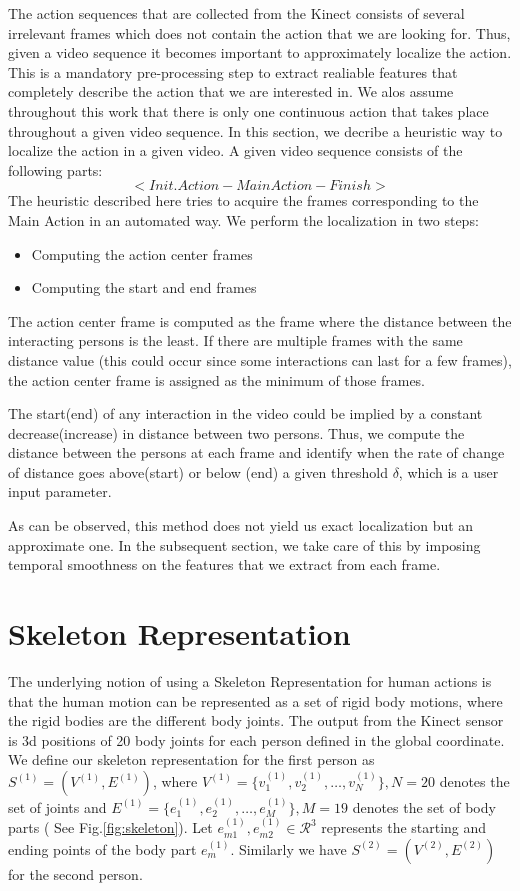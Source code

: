 \documentclass[10pt,twocolumn,letterpaper]{article}
\begin{document}
The action sequences that are collected from the Kinect consists of several irrelevant frames which does not contain the action that we are looking for. Thus, given a video sequence it becomes important to approximately localize the action. This is a mandatory pre-processing step to extract realiable features that completely describe the action that  we are interested in. We alos assume throughout this work that there is only one continuous action that takes place throughout a given video sequence. In this section, we decribe a heuristic way to localize the action in a given video. A given video sequence consists of the following parts:
\begin{equation}
<Init. Action - Main Action - Finish>
\end{equation}
The heuristic described here tries to acquire the frames corresponding to the Main Action  in an automated way. We perform the localization in two steps:
\begin{itemize}
\item Computing the action center frames
\item Computing the start and end frames
\end{itemize}

The action center frame is computed as the frame where the distance between the interacting persons is the least. If there are multiple frames with the same distance value (this could occur since some interactions can last for a few frames), the action center frame is assigned as the minimum of those frames.

The start(end) of any interaction in the video could be implied by a constant decrease(increase) in distance between two persons. Thus, we compute the distance between the persons at each frame and identify when the rate of change of distance goes above(start) or below (end) a given threshold $\delta$, which is a user input parameter. 


As can be observed, this method does not yield us exact localization but an approximate one. In the subsequent section, we take care of this by imposing temporal smoothness on the features that we extract from each frame. 


\section{Skeleton Representation}\label{sec:Feat}

The underlying notion of using a Skeleton Representation for human actions is that the human motion can be represented as a set of rigid body motions, where the rigid bodies are the different body joints. The output from the Kinect sensor is 3d positions of 20 body joints for each person defined in the global coordinate. We define our skeleton representation for the first person as $S^{(1)}=(V^{(1)},E^{(1)})$, where $V^{(1)}=\{v_{1}^{(1)},v_{2}^{(1)},\dots,v_{N}^{(1)}\}, N=20$ denotes the set of joints and $E^{(1)}=\{e_{1}^{(1)},e_{2}^{(1)},\dots,e_{M}^{(1)}\}, M=19$ denotes the set of body parts ( See Fig.\ref{fig:skeleton}). Let $e_{m1}^{(1)},e_{m2}^{(1)} \in \mathcal{R}^3$ represents the starting and ending points of the body part $e_{m}^{(1)}$. Similarly we have $S^{(2)}=(V^{(2)},E^{(2)})$ for the second person.
\end{document}
